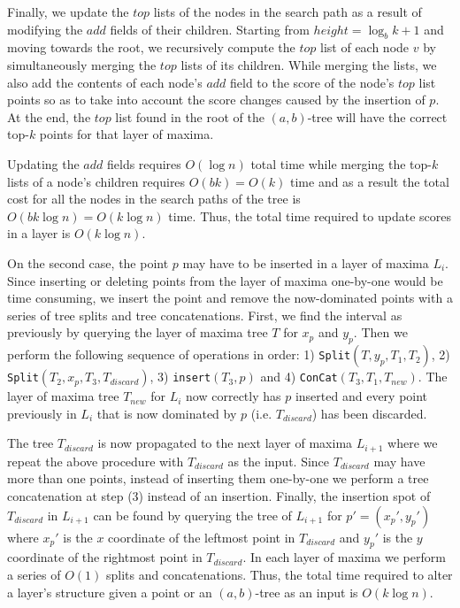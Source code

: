 \documentclass{llncs}
\begin{document}
Finally, we update the $top$ lists of the nodes in the search path as a result of modifying the $add$ fields of their children. Starting from $height = \log_{b}k + 1$ and moving towards the root, we recursively compute the $top$ list of each node $v$ by simultaneously merging the $top$ lists of its children. While merging the lists, we also add the contents of each node's $add$ field to the score of the node's $top$ list points so as to take into account the score changes caused by the insertion of $p$. At the end, the $top$ list found in the root of the $(a,b)$-tree will have the correct top-$k$ points for that layer of maxima.

Updating the $add$ fields requires $O(\log n)$ total time while merging the top-$k$ lists of a node's children requires $O(bk)=O(k)$ time and as a result the total cost for all the nodes in the search paths of the tree is $O(bk\log n)=O(k\log n)$ time. Thus, the total time required to update scores in a layer is $O(k\log n)$.

On the second case, the point $p$ may have to be inserted in a layer of maxima $L_i$. Since inserting or deleting points from the layer of maxima one-by-one would be time consuming, we insert the point and remove the now-dominated points with a series of tree splits and tree concatenations. First, we find the interval as previously by querying the layer of maxima tree $T$ for $x_p$ and $y_p$. Then we perform the following sequence of operations in order: 1) \texttt{Split$(T,y_p,T_1,T_2)$}, 2) \texttt{Split$(T_2,x_p,T_3,T_{discard})$}, 3) \texttt{insert$(T_3,p)$} and 4) \texttt{ConCat$(T_3,T_1,T_{new})$}.
The layer of maxima tree $T_{new}$ for $L_i$ now correctly has $p$ inserted and every point previously in $L_i$ that is now dominated by $p$ (i.e. $T_{discard}$) has been discarded.

The tree $T_{discard}$ is now propagated to the next layer of maxima $L_{i+1}$ where we repeat the above procedure with $T_{discard}$ as the input. Since $T_{discard}$ may have more than one points, instead of inserting them one-by-one we perform a tree concatenation at step (3) instead of an insertion. Finally, the insertion spot of $T_{discard}$ in $L_{i+1}$ can be found by querying the tree of $L_{i+1}$ for $p'=(x_p',y_p')$ where $x_p'$ is the $x$ coordinate of the leftmost point in $T_{discard}$ and $y_p'$ is the $y$ coordinate of the rightmost point in $T_{discard}$. In each layer of maxima we perform a series of $O(1)$ splits and concatenations. Thus, the total time required to alter a layer's structure given a point or an $(a,b)$-tree as an input is $O(k\log n)$.
\end{document}
